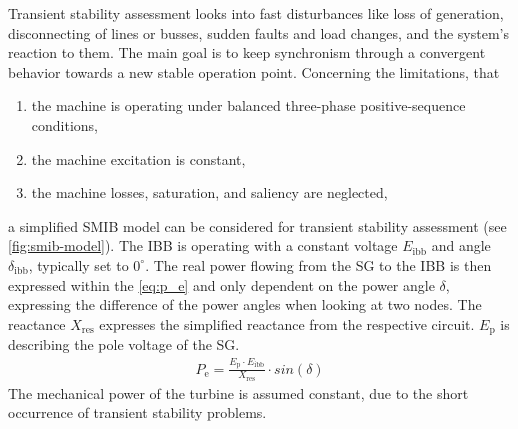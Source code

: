 Transient stability assessment looks into fast disturbances like loss of generation, disconnecting of lines or busses, sudden faults and load changes, and the system's reaction to them. The main goal is to keep synchronism through a convergent behavior towards a new stable operation point. Concerning the limitations, that
\begin{enumerate}
        \item the machine is operating under balanced three-phase positive-sequence conditions,
        \item the machine excitation is constant,
        \item the machine losses, saturation, and saliency are neglected,
\end{enumerate}
a simplified \acf{SMIB} model can be considered for transient stability assessment (see \autoref{fig:smib-model}).  The \ac{IBB} is operating with a constant voltage $E_\mathrm{ibb}$ and angle $\delta_\mathrm{ibb}$, typically set to $0^\circ$. The real power flowing from the \ac{SG} to the \ac{IBB} is then expressed within the \autoref{eq:p_e} \autocite{kundurPowerSystemStability2022,machowskiPowerSystemDynamics2020,oedingElektrischeKraftwerkeUnd2016} and only dependent on the power angle $\delta$, expressing the difference of the power angles when looking at two nodes. The reactance $X_\mathrm{res}$ expresses the simplified reactance from the respective circuit. $E_\mathrm{p}$ is describing the pole voltage of the \acs{SG}.
\begin{align}
        P_\mathrm{e}=\frac{E_\mathrm{p} \cdot E_\mathrm{ibb}}{X_\mathrm{res}} \cdot sin(\delta) \label{eq:p_e}
\end{align}
The mechanical power of the turbine is assumed constant, due to the short occurrence of transient stability problems.

